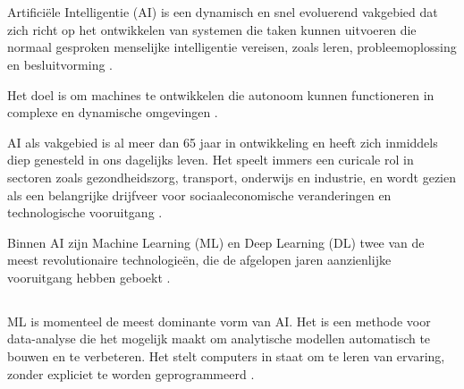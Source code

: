 \chapter{}%
\label{ch:stand-van-zaken}



\section{}%
\label{sec:artificiële-intelligentie}

Artificiële Intelligentie (AI) is een dynamisch en snel evoluerend vakgebied dat zich richt op het ontwikkelen van systemen die taken kunnen uitvoeren die normaal gesproken menselijke intelligentie vereisen, zoals leren, probleemoplossing en besluitvorming \autocite{SharifaniEtAl2023}.

Het doel is om machines te ontwikkelen die autonoom kunnen functioneren in complexe en dynamische omgevingen \autocite{Kouassi2023}.

AI als vakgebied is al meer dan 65 jaar in ontwikkeling en heeft zich inmiddels diep genesteld in ons dagelijks leven. Het speelt immers een curicale rol in sectoren zoals gezondheidszorg, transport, onderwijs en industrie, en wordt gezien als een belangrijke drijfveer voor sociaaleconomische veranderingen en technologische vooruitgang \autocite{JiangEtAl2022}.

Binnen AI zijn Machine Learning (ML) en Deep Learning (DL) twee van de meest revolutionaire technologieën, die de afgelopen jaren aanzienlijke vooruitgang hebben geboekt \autocite{SharifaniEtAl2023}.

\section{}%
\label{sec:machine-learning}

ML is momenteel de meest dominante vorm van AI. Het is een methode voor data-analyse die het mogelijk maakt om analytische modellen automatisch te bouwen en te verbeteren. Het stelt computers in staat om te leren van ervaring, zonder expliciet te worden geprogrammeerd \autocite{SharifanEtAl2023}.

